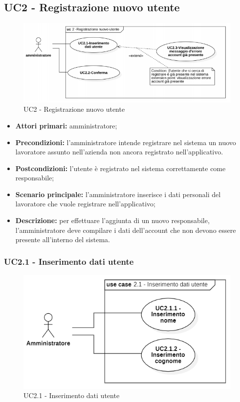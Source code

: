 \subsection{UC2 - Registrazione nuovo utente}

\begin{figure}[H]
	\centering
	\includegraphics[scale=0.52]{res/images/uc2.png}
	\caption{UC2 - Registrazione nuovo utente}
\end{figure}
\begin{itemize}
	\item 	\textbf{Attori primari:} amministratore;
	\item 	\textbf{Precondizioni:}	l'amministratore intende registrare nel sistema un nuovo lavoratore assunto nell'azienda non ancora registrato nell'applicativo.
	\item 	\textbf{Postcondizioni:} l'utente è registrato nel sistema correttamente come responsabile;
	\item 	\textbf{Scenario principale:} l'amministratore inserisce i dati personali del lavoratore che vuole registrare nell'applicativo;
	\item 	\textbf{Descrizione:} per effettuare l'aggiunta di un nuovo responsabile, l'amministratore deve compilare i dati dell'account che non devono essere presente all'interno del sistema.

\end{itemize}

\subsubsection{UC2.1 - Inserimento dati utente}

\begin{figure}[H]
	\centering
	\includegraphics[scale=0.52]{res/images/uc2-1.png}
	\caption{UC2.1 - Inserimento dati utente}
\end{figure}

